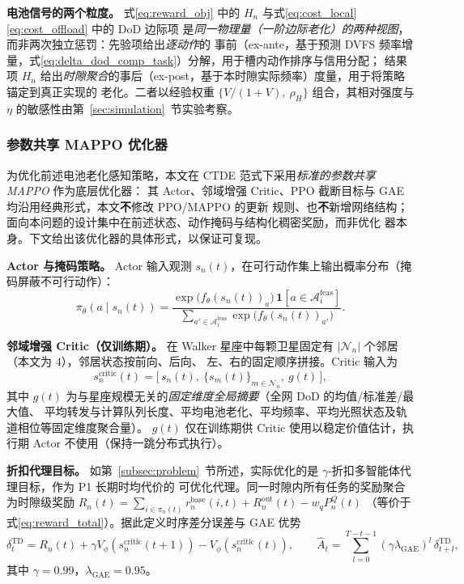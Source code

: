 \documentclass[a4paper,11pt]{article}
\begin{document}
\noindent\textbf{电池信号的两个粒度。}
式\eqref{eq:reward_obj} 中的 $H_n$ 与式\eqref{eq:cost_local}\eqref{eq:cost_offload} 中的 DoD 边际项
是\emph{同一物理量（一阶边际老化）的两种视图}，而非两次独立惩罚：先验项给出\emph{逐动作}的
事前（ex-ante，基于预测 DVFS 频率增量，式\eqref{eq:delta_dod_comp_task}）分解，用于槽内动作排序与信用分配；
结果项 $H_n$ 给出\emph{时隙聚合}的事后（ex-post，基于本时隙实际频率）度量，用于将策略锚定到真正实现的
老化。二者以经验权重 $\{V/(1+V),\ \rho_H\}$ 组合，其相对强度与 $\eta$ 的敏感性由第~\ref{sec:simulation}~节实验考察。

\subsubsection{参数共享 MAPPO 优化器}
\label{subsec:updates}

为优化前述电池老化感知策略，本文在 CTDE 范式下采用\emph{标准的参数共享 MAPPO} 作为底层优化器：
其 Actor、邻域增强 Critic、PPO 截断目标与 GAE 均沿用经典形式，本文\textbf{不}修改 PPO/MAPPO 的更新
规则、也\textbf{不}新增网络结构；面向本问题的设计集中在前述状态、动作掩码与结构化稠密奖励，而非优化
器本身。下文给出该优化器的具体形式，以保证可复现。

\noindent\textbf{Actor 与掩码策略。}
Actor 输入观测 $s_n(t)$，在可行动作集上输出概率分布（掩码屏蔽不可行动作）：
\begin{equation}
\pi_\theta(a \mid s_n(t))
= \frac{\exp\!\big(f_\theta(s_n(t))_a\big)\,\mathbf{1}[a \in \mathcal{A}^{\mathrm{feas}}_i]}
{\sum_{a'\in\mathcal{A}^{\mathrm{feas}}_i}\exp\!\big(f_\theta(s_n(t))_{a'}\big)}.
\label{eq:actor}
\end{equation}

\noindent\textbf{邻域增强 Critic（仅训练期）。}
在 Walker 星座中每颗卫星固定有 $|\mathcal{N}_n|$ 个邻居（本文为 $4$），邻居状态按前向、后向、
左、右的固定顺序拼接。Critic 输入为
\begin{equation}
s^{\mathrm{critic}}_n(t) = \big[\,s_n(t),\ \{s_m(t)\}_{m \in \mathcal{N}_n},\ g(t)\,\big],
\label{eq:critic_input}
\end{equation}
其中 $g(t)$ 为与星座规模无关的\emph{固定维度全局摘要}（全网 DoD 的均值/标准差/最大值、
平均转发与计算队列长度、平均电池老化、平均频率、平均光照状态及轨道相位等固定维度聚合量）。
$g(t)$ 仅在训练期供 Critic 使用以稳定价值估计，执行期 Actor 不使用（保持一跳分布式执行）。

\noindent\textbf{折扣代理目标。}
如第~\ref{subsec:problem}~节所述，实际优化的是 $\gamma$-折扣多智能体代理目标，作为 P1 长期时均代价的
可优化代理。同一时隙内所有任务的奖励聚合为时隙级奖励
$R_n(t) = \sum_{i \in \pi_n(t)} r^{\mathrm{base}}_n(i,t) + R^{\mathrm{out}}_n(t) - w_q P^Q_n(t)$
（等价于式\eqref{eq:reward_total}）。据此定义时序差分误差与 GAE 优势
\begin{equation}
\delta^{\mathrm{TD}}_t = R_n(t) + \gamma V_\phi(s^{\mathrm{critic}}_n(t\!+\!1))
- V_\phi(s^{\mathrm{critic}}_n(t)),
\qquad
\hat{A}_t = \sum_{l=0}^{T-t-1}
(\gamma\lambda_{\mathrm{GAE}})^l\,\delta^{\mathrm{TD}}_{t+l},
\label{eq:gae}
\end{equation}
其中 $\gamma=0.99$，$\lambda_{\mathrm{GAE}}=0.95$。
\end{document}
